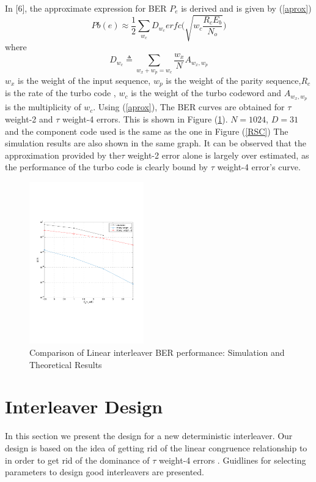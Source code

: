 \documentclass[twocolumn]{article}
\begin{document}
In [6], the approximate expression for BER $P_e$ is derived and is given by
(\ref{aprox})
\begin{equation} 
 Pb(e) \approx \frac{1}{2}\sum_{w_c}D_{w_c} 
  erfc \Bigg(\sqrt{w_c\frac{R_cE_b}{N_o}} \Bigg)
  \label{aprox}
  \end{equation}
 where 
  $$ D_{w_c}\triangleq \sum_{w_x+w_p=w_c} \frac{w_x}{N}A_{w_x,w_p}$$
  $w_x$ is the weight of the input sequence, $w_p$ is the weight of the parity 
  sequence,$R_c$ is the rate of the turbo code , $w_c$ is the weight of the turbo 
  codeword and $A_{w_x,w_p}$ is the multiplicity of $w_c$. Using (\ref{aprox}),
  The BER curves are obtained for $\tau$ weight-2 and $\tau$ weight-4 errors. 
  This is shown in Figure (\ref{comp}). $N=1024$, $D=31$ and the component code used is the
  same as the one in Figure (\ref{RSC})
  The simulation results are also shown in the same graph. It can be observed that
  the approximation provided by the$\tau$ weight-2 error alone is largely over estimated,
  as the performance of the turbo code is clearly bound by  $\tau$ weight-4 error's
  curve. 
\begin{figure}[h!]
\centering
		\includegraphics[height = 7cm,trim={0 7.2cm 0 6cm},clip]{D_31_N_1024_sim_VS_theory.pdf}
		\caption{Comparison of Linear interleaver BER performance: Simulation and Theoretical Results}
		\label{comp}
		\end{figure}





\section{Interleaver Design}
\label{sec}
In this section we present the design for a new deterministic interleaver. 
Our design is based on the idea of getting rid of the linear congruence
relationship to in order to get rid of the dominance of $\tau$ weight-4 errors
 . Guidlines for selecting
parameters to design good interleavers are presented.  
\end{document}
